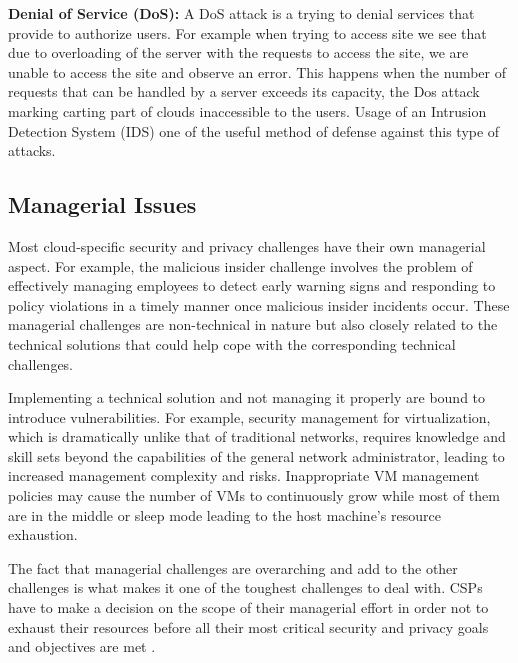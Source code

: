 \documentclass[twocolumn]{article}
\begin{document}
\textbf{Denial of Service (DoS):} A DoS attack is a trying to denial services that provide to authorize users. For example when trying to access site we see that due to overloading of the server with the requests to access the site, we are unable to access the site and observe an error. This happens when the number of requests that can be handled by a server exceeds its capacity, the Dos attack marking carting part of clouds inaccessible to the users. Usage of an Intrusion Detection System (IDS) one of the useful method of defense against this type of attacks.

\subsection{Managerial Issues}
Most cloud-specific security and privacy challenges have their own managerial aspect. For example, the malicious insider challenge involves the problem of effectively managing employees to detect early warning signs and responding to policy violations in a timely manner once malicious insider incidents occur. These managerial challenges are non-technical in nature but also closely related to the technical solutions that could help cope with the corresponding technical challenges.

Implementing a technical solution and not managing it properly are bound to introduce vulnerabilities. For example, security management for virtualization, which is dramatically unlike that of traditional networks, requires knowledge and skill sets beyond the capabilities of the general network administrator, leading to increased management complexity and risks. Inappropriate VM management policies may cause the number of VMs to continuously grow while most of them are in the middle or sleep mode leading to the host machine’s resource exhaustion.

The fact that managerial challenges are overarching and add to the other challenges is what makes it one of the toughest challenges to deal with. CSPs have to make a decision on the scope of their managerial effort in order not to exhaust their resources before all their most critical security and privacy goals and objectives are met \cite{liu2015survey}.

\end{document}
